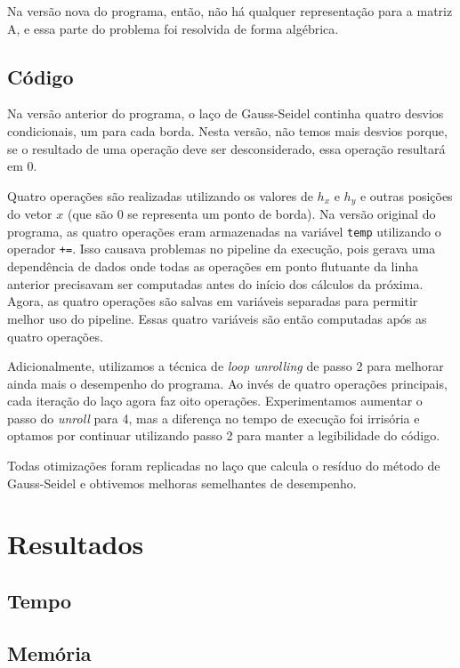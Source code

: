 \documentclass[12pt]{article}
\begin{document}
	Na versão nova do programa, então, não há qualquer representação para a matriz A, e essa parte do problema foi resolvida de forma algébrica.

	\subsection{Código}
	
	Na versão anterior do programa, o laço de Gauss-Seidel continha quatro desvios condicionais, um para cada borda.
	Nesta versão, não temos mais desvios porque, se o resultado de uma operação deve ser desconsiderado, essa operação resultará em $0$.
	
	Quatro operações são realizadas utilizando os valores de $h_x$ e $h_y$ e outras posições do vetor $x$ (que são $0$ se representa um ponto de borda).
	Na versão original do programa, as quatro operações eram armazenadas na variável \texttt{temp} utilizando o operador \texttt{+=}.
	Isso causava problemas no pipeline da execução, pois gerava uma dependência de dados onde todas as operações em ponto flutuante da linha anterior precisavam ser computadas antes do início dos cálculos da próxima.
	Agora, as quatro operações são salvas em variáveis separadas para permitir melhor uso do pipeline. 
	Essas quatro variáveis são então computadas após as quatro operações.
	
	Adicionalmente, utilizamos a técnica de \emph{loop unrolling} de passo 2 para melhorar ainda mais o desempenho do programa.
	Ao invés de quatro operações principais, cada iteração do laço agora faz oito operações.
	Experimentamos aumentar o passo do \emph{unroll} para 4, mas a diferença no tempo de execução foi irrisória e optamos por continuar utilizando passo 2 para manter a legibilidade do código.
	
	Todas otimizações foram replicadas no laço que calcula o resíduo do método de Gauss-Seidel e obtivemos melhoras semelhantes de desempenho.

\newpage

\section{Resultados}

\subsection{Tempo}

\subsection{Memória}

\newpage
\end{document}
